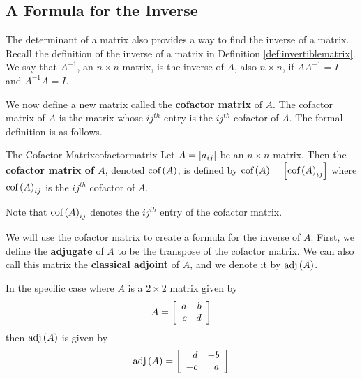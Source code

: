 \subsection{A Formula for the Inverse}

The determinant of a matrix also provides a way to find the inverse of a matrix.
Recall the definition of the inverse of a matrix in Definition \ref{def:invertiblematrix}.
We say that $A^{-1}$, an $n \times n$ matrix, is the inverse of $A$, also $n \times n$, if $AA^{-1} = I$ and $A^{-1}A=I$. 

We now define a new matrix called the \textbf{cofactor matrix} of $A$.  
The cofactor matrix of $A$ is the matrix whose $ij^{th}$ entry is the $ij^{th}$ cofactor of $A$.
The formal definition is as follows.

\begin{definition}{The Cofactor Matrix}{cofactormatrix}
Let $A=\left[ a_{ij}\right]$ be an $n\times n$ matrix. Then the
\textbf{cofactor matrix of $A$}, denoted 
$\mbox{cof}\left( A\right)$, is defined by $\mbox{cof}\left( A\right) =\left[
\mbox{cof}\left(A\right)_{ij}\right] $ where  $\mbox{cof}\left(A\right)_{ij}$ is the $ij^{th}$ cofactor of $A$.
\end{definition}

Note that $\mbox{cof}\left(A\right)_{ij}$ denotes the $ij^{th}$ entry of the cofactor matrix.

We will use the cofactor matrix to create a formula for the inverse of $A$. First,
we define the \textbf{adjugate} of $A$ to be the transpose of 
the cofactor matrix. We can also call this matrix the \textbf{classical adjoint} of $A$,
and we denote it by $\mbox{adj} \left(A\right)$. 

In the specific case where $A$ is a $2 \times 2$ matrix given by
\begin{equation*}
A = \left[
\begin{array}{rr}
a & b \\
c & d
\end{array}
\right]
\end{equation*}
then $\mbox{adj}\left(A\right)$ is given by
\begin{equation*}
\mbox{adj}\left(A\right) = 
\left[
\begin{array}{rr}
d & -b \\
-c & a
\end{array}
\right]
\end{equation*}

